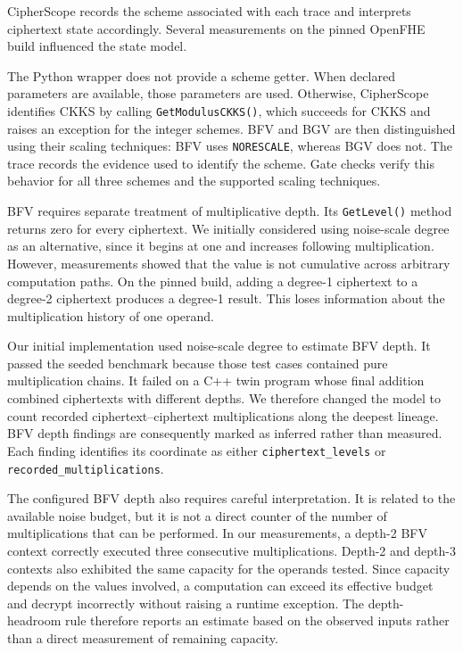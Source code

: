 \documentclass[pdflatex,sn-basic,Numbered,iicol]{sn-jnl}
\begin{document}
CipherScope records the scheme associated with each trace and interprets
ciphertext state accordingly. Several measurements on the pinned OpenFHE
build influenced the state model.

The Python wrapper does not provide a scheme getter. When declared parameters
are available, those parameters are used. Otherwise, CipherScope identifies
CKKS by calling \texttt{GetModulusCKKS()}, which succeeds for CKKS and raises
an exception for the integer schemes. BFV and BGV are then distinguished
using their scaling techniques: BFV uses \texttt{NORESCALE}, whereas BGV does
not. The trace records the evidence used to identify the scheme. Gate checks
verify this behavior for all three schemes and the supported scaling
techniques.

BFV requires separate treatment of multiplicative depth. Its
\texttt{GetLevel()} method returns zero for every ciphertext. We initially
considered using noise-scale degree as an alternative, since it begins at one
and increases following multiplication. However, measurements showed that the
value is not cumulative across arbitrary computation paths. On the pinned
build, adding a degree-1 ciphertext to a degree-2 ciphertext produces a
degree-1 result. This loses information about the multiplication history of
one operand.

Our initial implementation used noise-scale degree to estimate BFV depth. It
passed the seeded benchmark because those test cases contained pure
multiplication chains. It failed on a C++ twin program whose final addition
combined ciphertexts with different depths. We therefore changed the model to
count recorded ciphertext--ciphertext multiplications along the deepest
lineage. BFV depth findings are consequently marked as inferred rather than
measured. Each finding identifies its coordinate as either
\texttt{ciphertext\_levels} or \texttt{recorded\_multiplications}.

The configured BFV depth also requires careful interpretation. It is related
to the available noise budget, but it is not a direct counter of the number
of multiplications that can be performed. In our measurements, a depth-2 BFV
context correctly executed three consecutive multiplications. Depth-2 and
depth-3 contexts also exhibited the same capacity for the operands tested.
Since capacity depends on the values involved, a computation can exceed its
effective budget and decrypt incorrectly without raising a runtime exception.
The depth-headroom rule therefore reports an estimate based on the observed
inputs rather than a direct measurement of remaining capacity.
\end{document}
